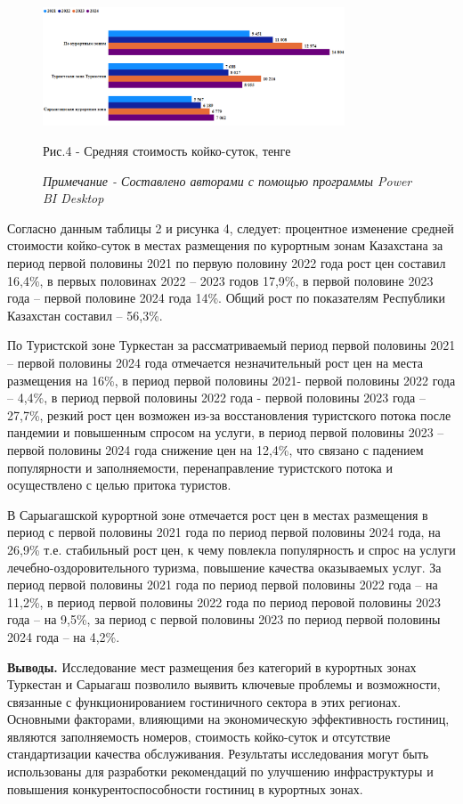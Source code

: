 \begin{figure}[H]
	\centering
	\includegraphics[width=0.8\textwidth]{media/ekon/image6}
	\caption*{Рис.4 - Средняя стоимость койко-суток, тенге}
	\caption*{\normalfont\emph{Примечание - Составлено авторами с помощью программы Power BI Desktop}}
\end{figure}

\begin{multicols}{2}
Согласно данным таблицы 2 и рисунка 4, следует: процентное изменение
средней стоимости койко-суток в местах размещения по курортным зонам
Казахстана за период первой половины 2021 по первую половину 2022 года
рост цен составил 16,4\%, в первых половинах 2022 -- 2023 годов 17,9\%,
в первой половине 2023 года -- первой половине 2024 года 14\%. Общий
рост по показателям Республики Казахстан составил -- 56,3\%.

По Туристской зоне Туркестан за рассматриваемый период первой половины
2021 -- первой половины 2024 года отмечается незначительный рост цен на
места размещения на 16\%, в период первой половины 2021- первой половины
2022 года -- 4,4\%, в период первой половины 2022 года - первой половины
2023 года -- 27,7\%, резкий рост цен возможен из-за восстановления
туристского потока после пандемии и повышенным спросом на услуги, в
период первой половины 2023 -- первой половины 2024 года снижение цен на
12,4\%, что связано с падением популярности и заполняемости,
перенаправление туристского потока и осуществлено с целью притока
туристов.

В Сарыагашской курортной зоне отмечается рост цен в местах размещения в
период с первой половины 2021 года по период первой половины 2024 года,
на 26,9\% т.е. стабильный рост цен, к чему повлекла популярность и спрос
на услуги лечебно-оздоровительного туризма, повышение качества
оказываемых услуг. За период первой половины 2021 года по период первой
половины 2022 года -- на 11,2\%, в период первой половины 2022 года по
период перовой половины 2023 года -- на 9,5\%, за период с первой
половины 2023 по период первой половины 2024 года -- на 4,2\%.

{\bfseries Выводы.} Исследование мест размещения без категорий в курортных
зонах Туркестан и Сарыагаш позволило выявить ключевые проблемы и
возможности, связанные с функционированием гостиничного сектора в этих
регионах. Основными факторами, влияющими на экономическую эффективность
гостиниц, являются заполняемость номеров, стоимость койко-суток и
отсутствие стандартизации качества обслуживания. Результаты исследования
могут быть использованы для разработки рекомендаций по улучшению
инфраструктуры и повышения конкурентоспособности гостиниц в курортных
зонах.


\end{multicols}
